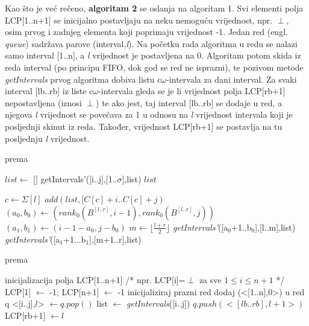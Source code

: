 \documentclass[times, utf8, seminar]{fer}
\begin{document}
Kao što je već rečeno, \textbf{algoritam 2} se oslanja na algoritam 1. Svi elementi polja LCP[1..n+1] se inicijalno postavljaju na neku nemoguću vrijednost, npr. $\perp$, osim prvog i zadnjeg elementa koji poprimaju vrijednost -1. Jedan red (engl. \textit{queue}) sadržava parove (interval,\textit{l}). Na početku rada algoritma u redu se nalazi samo interval [1..n], a \textit{l} vrijednost je postavljena na 0. Algoritam potom skida iz reda interval (po principu FIFO, dok god se red ne isprazni), te pozivom metode \textit{getIntervals} prvog algoritma dobiva listu c$\omega$-intervala za dani interval. Za svaki interval [lb..rb] iz liste c$\omega$-intervala gleda se je li vrijednost polja LCP[rb+1] nepostavljena (iznosi $\perp$) te ako jest, taj interval [lb..rb] se dodaje u red, a njegova \textit{l} vrijednost se povećava za 1 u odnosu na \textit{l} vrijednost intervala koji je posljednji skinut iz reda. Također, vrijednost LCP[rb+1] se postavlja na tu posljednju \textit{l} vrijednost. 

\begin{algorithm}[H]
\caption{prema \cite{beller2013}}
\label{alg1}
\begin{algorithmic}
\State $list \gets$ []
\State getIntervals'([i..j],[1..$\sigma$],list)
\State \Return $list$
\EndFunction

	\State $c \gets \Sigma[l]$
	\State $add(list, [C[c]+i..C[c]+j)$ 
\Else
	\State $(a_0,b_0) \gets (rank_0(B^{[l..r]},i-1),rank_0(B^{[l..r]},j))$
	\State $(a_1,b_1) \gets (i-1-a_0,j-b_0)$
	\State $m \gets \lfloor\frac{l+r}{2}\rfloor$ 
	\State \textit{getIntervals'}([a$_0$+1..b$_0$],[l..m],list)
	\EndIf
	\State \textit{getIntervals'}([a$_1$+1...b$_1$],[m+1..r],list)
	\EndIf
\EndIf

\EndFunction
\end{algorithmic}
\end{algorithm}



\begin{algorithm}[H]
\caption{prema \cite{beller2013}}
\label{alg2}
\begin{algorithmic}
\State inicijalizacija polja LCP[1..n+1]  /* npr. LCP[i]=$\perp$ za sve $1 \leq i \leq n+1$ */
\State LCP[1] $\gets$ -1; LCP[n+1] $\gets$ -1
\State inicijaliziraj prazni red
\State dodaj (<[1..n],0>) u red q
\State <[i..j],$l$> $\gets q.pop()$
\State list $\gets$ \textit{getIntervals}([i..j])
\State $q.push(<[lb..rb],l+1>)$
\State LCP[rb+1] $\gets l$
\EndIf
\EndFor

\EndWhile
\end{algorithmic}
\end{algorithm}
\end{document}
